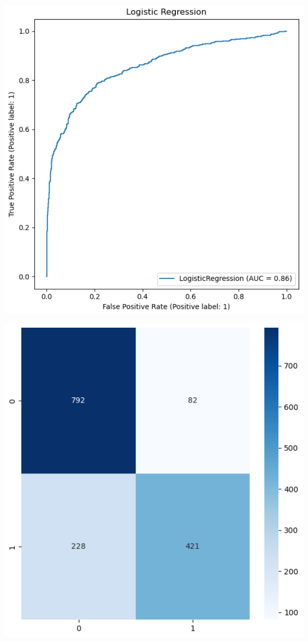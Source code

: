 \documentclass[11pt]{article}
\begin{document}
\begin{minipage}[t]{.45\linewidth}
\includegraphics[width=\linewidth]{images/lr_plot.png}
\end{minipage}\hfill
\begin{minipage}[b]{.45\linewidth}
\includegraphics[width=\linewidth]{images/lr_heatmap.png}
\end{minipage}\hfill
\end{document}
